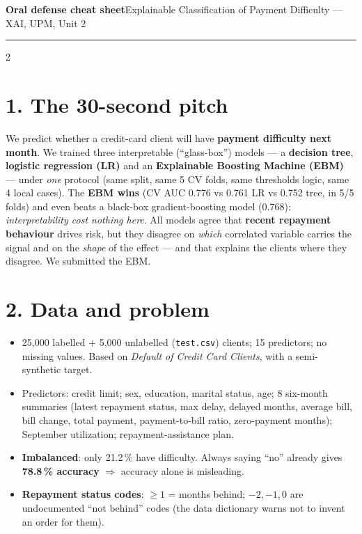 \documentclass[a4paper,9pt]{extarticle}
\begin{document}
{\LARGE\bfseries\color{accent} Oral defense cheat sheet}\hfill{\small Explainable Classification of Payment Difficulty --- XAI, UPM, Unit 2}\par
\vspace{0.3ex}\textcolor{accent}{\rule{\linewidth}{1pt}}

\begin{multicols}{2}

\section{1. The 30-second pitch}
We predict whether a credit-card client will have \textbf{payment difficulty next month}. We trained three
interpretable (``glass-box'') models --- a \textbf{decision tree}, \textbf{logistic regression (LR)} and an
\textbf{Explainable Boosting Machine (EBM)} --- under \emph{one} protocol (same split, same 5 CV folds, same
thresholds logic, same 4 local cases). The \textbf{EBM wins} (CV AUC 0.776 vs 0.761 LR vs 0.752 tree, in 5/5 folds)
and even beats a black-box gradient-boosting model (0.768): \emph{interpretability cost nothing here}. All models
agree that \textbf{recent repayment behaviour} drives risk, but they disagree on \emph{which} correlated variable
carries the signal and on the \emph{shape} of the effect --- and that explains the clients where they disagree.
We submitted the EBM.

\section{2. Data and problem}
\begin{itemize}
\item 25{,}000 labelled + 5{,}000 unlabelled (\texttt{test.csv}) clients; 15 predictors; no missing values.
      Based on \emph{Default of Credit Card Clients}, with a semi-synthetic target.
\item Predictors: credit limit; sex, education, marital status, age; 8 six-month summaries (latest repayment
      status, max delay, delayed months, average bill, bill change, total payment, payment-to-bill ratio,
      zero-payment months); September utilization; repayment-assistance plan.
\item \textbf{Imbalanced}: only 21.2\,\% have difficulty. Always saying ``no'' already gives
      \textbf{78.8\,\% accuracy} $\Rightarrow$ accuracy alone is misleading.
\item \textbf{Repayment status codes}: $\geq 1$ = months behind; $-2,-1,0$ are undocumented ``not behind'' codes
      (the data dictionary warns not to invent an order for them).
\end{itemize}


\end{multicols}
\end{document}
